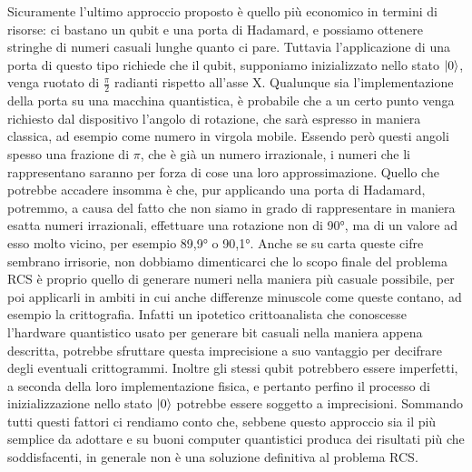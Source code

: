 \documentclass{book}
\theoremstyle{definition}
\theoremstyle{definition}
\theoremstyle{definition}
\theoremstyle{plain}
\theoremstyle{plain}
\theoremstyle{plain}
\theoremstyle{plain}
\begin{document}
Sicuramente l'ultimo approccio proposto è quello più economico in termini di risorse: ci bastano un qubit e una porta di Hadamard, e possiamo ottenere stringhe di numeri casuali lunghe quanto ci pare. Tuttavia l'applicazione di una porta di questo tipo richiede che il qubit, supponiamo inizializzato nello stato $\ket{0}$, venga ruotato di $\frac{\pi}{2}$ radianti rispetto all'asse X. Qualunque sia l'implementazione della porta su una macchina quantistica, è probabile che a un certo punto venga richiesto dal dispositivo l'angolo di rotazione, che sarà espresso in maniera classica, ad esempio come numero in virgola mobile. Essendo però questi angoli spesso una frazione di $\pi$, che è già un numero irrazionale, i numeri che li rappresentano saranno per forza di cose una loro approssimazione\cite{random_hadamard}. Quello che potrebbe accadere insomma è che, pur applicando una porta di Hadamard, potremmo, a causa del fatto che non siamo in grado di rappresentare in maniera esatta numeri irrazionali, effettuare una rotazione non di 90°, ma di un valore ad esso molto vicino, per esempio 89,9° o 90,1°. Anche se su carta queste cifre sembrano irrisorie, non dobbiamo dimenticarci che lo scopo finale del problema RCS è proprio quello di generare numeri nella maniera più casuale possibile, per poi applicarli in ambiti in cui anche differenze minuscole come queste contano, ad esempio la crittografia. Infatti un ipotetico crittoanalista che conoscesse l'hardware quantistico usato per generare bit casuali nella maniera appena descritta, potrebbe sfruttare questa imprecisione a suo vantaggio per decifrare degli eventuali crittogrammi. Inoltre gli stessi qubit potrebbero essere imperfetti, a seconda della loro implementazione fisica, e pertanto perfino il processo di inizializzazione nello stato $\ket{0}$ potrebbe essere soggetto a imprecisioni. Sommando tutti questi fattori ci rendiamo conto che, sebbene questo approccio sia il più semplice da adottare e su buoni computer quantistici produca dei risultati più che soddisfacenti, in generale non è una soluzione definitiva al problema RCS.\\
\end{document}
